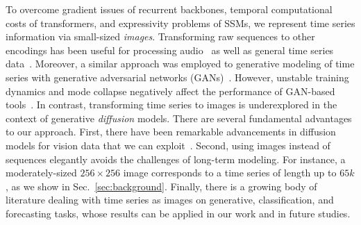 \documentclass{article}
\begin{document}

To overcome gradient issues of recurrent backbones, temporal computational costs of transformers, and expressivity problems of SSMs, we represent time series information via small-sized \emph{images}. Transforming raw sequences to other encodings has been useful for processing audio~\cite{greenberg2004automatic} as well as general time series data~\cite{wang2015imaging, hatami2018classification, li2024time}. Moreover, a similar approach was employed to generative modeling of time series with generative adversarial networks (GANs)~\cite{brophy2019quick, hellermann2021leveraging}. However, unstable training dynamics and mode collapse negatively affect the performance of GAN-based tools~\cite{lucic2018gans}. In contrast, transforming time series to images is underexplored in the context of generative \emph{diffusion} models. There are several fundamental advantages to our approach. First, there have been remarkable advancements in diffusion models for vision data that we can exploit~\cite{sohl2015deep, ho2020denoising, song2021scorebased, karras2022elucidating}. Second, using images instead of sequences elegantly avoids the challenges of long-term modeling. For instance, a moderately-sized $256 \times 256$ image corresponds to a time series of length up to $65k$, as we show in Sec.~\ref{sec:background}. Finally, there is a growing body of literature dealing with time series as images on generative, classification, and forecasting tasks, whose results can be applied in our work and in future studies.
\end{document}
